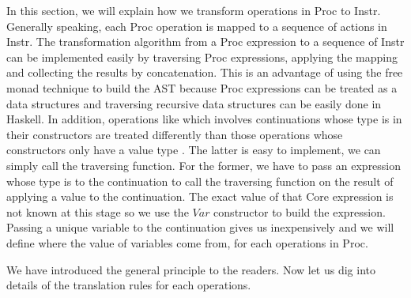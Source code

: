 In this section, we will explain how we transform operations in Proc to Instr. Generally speaking, each Proc operation is mapped to a sequence of actions in Instr. The transformation algorithm from a Proc expression to a sequence of Instr can be implemented easily by traversing Proc expressions, applying the mapping and collecting the results by concatenation. This is an advantage of using the free monad technique to build the AST because Proc expressions can be treated as a data structures and traversing recursive data structures can be easily done in Haskell. In addition, operations like  which involves continuations whose type is  in their constructors are treated differently than those operations whose constructors only have a value type . The latter is easy to implement, we can simply call the traversing function. For the former, we have to pass an expression whose type is  to the continuation to call the traversing function on the result of applying a value to the continuation. The exact value of that Core expression is not known at this stage so we use the $Var$ constructor to build the expression. Passing a unique variable to the continuation gives us  inexpensively and we will define where the value of variables come from, for each operations in Proc. 

We have introduced the general principle to the readers. Now let us dig into details of the translation rules for each operations. 

